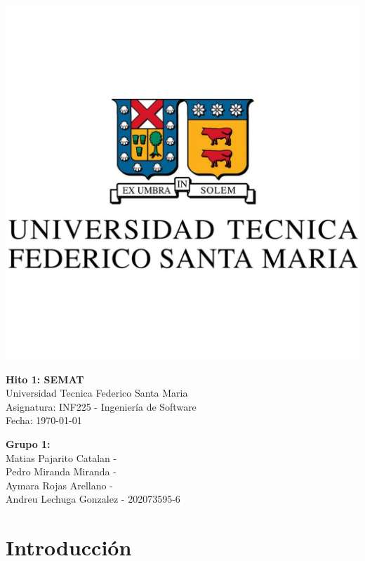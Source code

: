 \documentclass[12pt]{article}
\begin{document}
\begin{minipage}{0.2\textwidth}
    \includegraphics[width=\linewidth]{logo-usm.jpg} %
\end{minipage}
\hfill
\begin{minipage}{0.75\textwidth}
    \centering
    \vspace{0.5cm}
    {\LARGE \textbf{Hito 1: SEMAT}}\\[0.4cm]
    {\large Universidad Tecnica Federico Santa Maria}\\
    {\large Asignatura: INF225 - Ingeniería de Software}\\
    {\large Fecha: \today}
\end{minipage}

\vspace{1.5cm}

\noindent
\textbf{Grupo 1:}\\
Matias Pajarito Catalan - \\
Pedro Miranda Miranda - \\
Aymara Rojas Arellano - \\
Andreu Lechuga Gonzalez - 202073595-6

\vspace{1cm}

\section*{Introducción}
\end{document}
